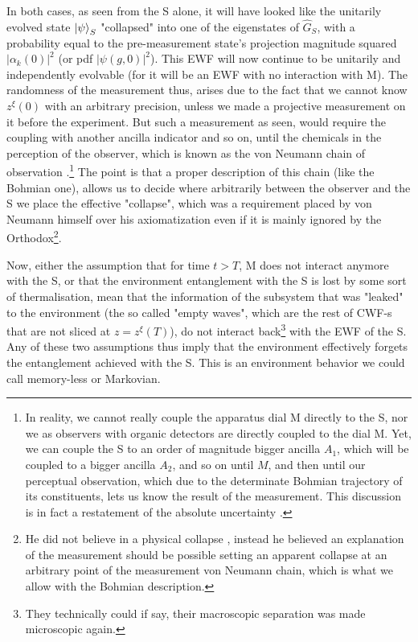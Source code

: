 \documentclass[11pt, a4paper]{article} %
\begin{document}
\newpage
In both cases, as seen from the S alone, it will have looked like the unitarily evolved state $\ket{\psi}_S$ "collapsed" into one of the eigenstates of $\hat{G}_S$, with a probability equal to the pre-measurement state's projection magnitude squared $|\alpha_k(0)|^2$ (or pdf $|\psi(g,0)|^2$). This EWF will now continue to be unitarily and independently evolvable (for it will be an EWF with no interaction with M). The randomness of the measurement thus, arises due to the fact that we cannot know $z^\xi(0)$ with an arbitrary precision, unless we made a projective measurement on it before the experiment. But such a measurement as seen, would require the coupling with another ancilla indicator and so on, until the chemicals in the perception of the observer, which is known as the von Neumann chain of observation \cite{vonNeumann}.\footnote{In reality, we cannot really couple the apparatus dial M directly to the S, nor we as observers with organic detectors are directly coupled to the dial M. Yet, we can couple the S to an order of magnitude bigger ancilla $A_1$, which will be coupled to a bigger ancilla $A_2$, and so on until $M$, and then until our perceptual observation, which due to the determinate Bohmian trajectory of its constituents, lets us know the result of the measurement. This discussion is in fact a restatement of the absolute uncertainty \cite{Absolute}.} The point is that a proper description of this chain (like the Bohmian one), allows us to decide where arbitrarily between the observer and the S we place the effective "collapse", which was a requirement placed by von Neumann himself \cite{vonNeumann, NeumannNoCollapse} over his axiomatization even if it is mainly ignored by the Orthodox\footnote{He did not believe in a physical collapse \cite{NeumannNoCollapse}, instead he believed an explanation of the measurement should be possible setting an apparent collapse at an arbitrary point of the measurement von Neumann chain, which is what we allow with the Bohmian description.}.

Now, either the assumption that for time $t>T$, M does not interact anymore with the S, or that the environment entanglement with the S is lost by some sort of thermalisation, mean that the information of the subsystem that was "leaked" to the environment (the so called "empty waves", which are the rest of CWF-s that are not sliced at $z=z^\xi(T)$), do not interact back\footnote{ They technically could if say, their macroscopic separation was made microscopic again. } with the EWF of the S. Any of these two assumptions thus imply that the environment effectively forgets the entanglement achieved with the S. This is an environment behavior we could call memory-less or Markovian.
\end{document}
